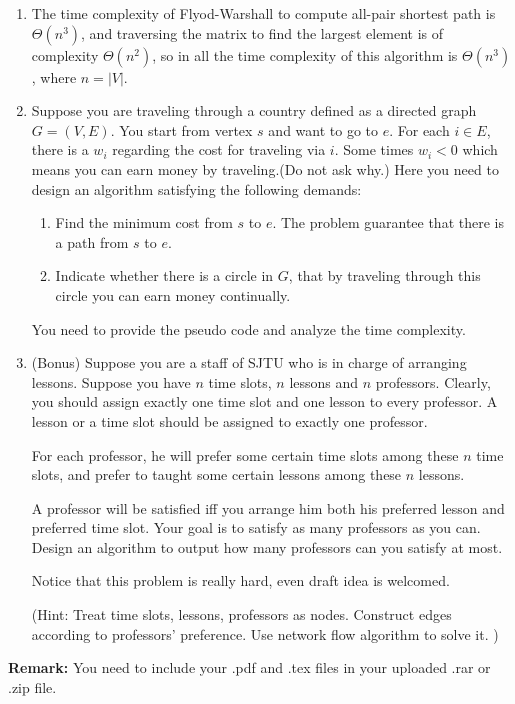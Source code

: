 \documentclass[12pt,a4paper]{article}
\makeatletter
\newtheorem*{solution}{Solution}
\theoremstyle{definition}
\renewenvironment{solution}[1][Solution] {\par\pushQED{\qed}\normalfont\topsep6\p@\@plus6\p@\relax\trivlist\item[\hskip\labelsep\bfseries#1\@addpunct{.}]\ignorespaces}{\popQED\endtrivlist\@endpefalse} \makeatother
\makeatother
\begin{document}
\begin{enumerate}
\begin{solution}
    The time complexity of Flyod-Warshall to compute all-pair shortest path is $\Theta(n^3)$, and traversing the matrix to find the largest element is of complexity $\Theta(n^2)$, so in all the time complexity of this algorithm is $\Theta(n^3)$, where $n=|V|$. 
\end{solution}


\item
   Suppose you are traveling through a country defined as a directed graph $G=(V,E)$. You start from vertex $s$ and want to go to $e$. For each $i\in E$, there is a $w_i$ regarding the cost for traveling via $i$. Some times $w_i<0$ which means you can earn money by traveling.(Do not ask why.) Here you need to design an algorithm satisfying the following demands:\par
   \begin{enumerate}
   \item Find the minimum cost from $s$ to $e$. The problem guarantee that there is a path from $s$ to $e$.\par
   \item Indicate whether there is a circle in $G$, that by traveling through this circle you can earn money continually.\par
   \end{enumerate}
   You need to provide the pseudo code and analyze the time complexity.\par

\item

\color{red}(Bonus)\color{black}
Suppose you are a staff of SJTU who is in charge of arranging lessons. Suppose you have $n$ time slots, $n$ lessons and $n$ professors. Clearly, you should assign exactly one time slot and one lesson to every professor. A lesson or a time slot should be assigned to exactly one professor. \par
For each professor, he will prefer some certain time slots among these $n$ time slots, and prefer to taught some certain lessons among these $n$ lessons.\par
A professor will be satisfied iff you arrange him both his preferred lesson and preferred time slot. Your goal is to satisfy as many professors as you can. Design an algorithm to output how many professors can you satisfy at most.\par 
Notice that this problem is really hard, even draft idea is welcomed.\par
\color{blue} (Hint: Treat time slots, lessons, professors as nodes. Construct edges according to professors' preference. Use network flow algorithm to solve it. )



    

\end{enumerate}

\vspace{20pt}

\textbf{Remark:} You need to include your .pdf and .tex files in your uploaded .rar or .zip file.

\end{document}

